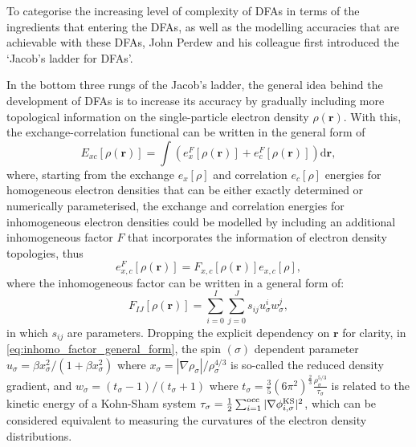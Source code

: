
To categorise the increasing level of complexity of DFAs in terms of the ingredients that entering the DFAs, as well as the modelling accuracies that are achievable with these DFAs, John Perdew and his colleague first introduced the `Jacob's ladder for DFAs'.\cite{perdew2001jacob} 

In the bottom three rungs of the Jacob's ladder, the general idea behind the development of DFAs is to increase its accuracy by gradually including more topological information on the single-particle electron density $\rho(\bm{r})$. With this, the exchange-correlation functional can be written in the general form of 
\begin{equation}\label{eq:Exc_general}
E_{xc}[\rho(\bm{r})]=\int (e_x^{F}[\rho(\bm{r})] + e_c^{F}[\rho(\bm{r})]) \mbox{d}\bm{r},
\end{equation}
where, starting from the exchange $e_{x}[\rho]$ and correlation $e_{c}[\rho]$ energies for homogeneous electron densities that can be either exactly determined or numerically parameterised, the exchange and correlation energies for inhomogeneous electron densities could be modelled by including an additional inhomogeneous factor $F$ that incorporates the information of electron density topologies, thus
\begin{equation}\label{eq:Exc_inhomo}
    e^{F}_{x,c}[\rho(\bm{r})]=F_{x,c}[\rho(\bm{r})] e_{x,c}[\rho],
\end{equation}
where the inhomogeneous factor can be written in a general form of:\cite{mardirossian2017thirty}
\begin{equation}\label{eq:inhomo_factor_general_form}
F_{IJ}[\rho(\bm{r})]=\sum_{i=0}^{I}\sum_{j=0}^{J} s_{ij}u_\sigma^i w_\sigma^j, 
\end{equation}
in which $s_{ij}$ are parameters. Dropping the explicit dependency on $\bm{r}$ for clarity, in \cref{eq:inhomo_factor_general_form}, the spin $(\sigma)$ dependent parameter $u_\sigma=\beta x_\sigma^2/(1+\beta x_\sigma^2)$ where $x_\sigma=|\nabla\rho_\sigma|/\rho_\sigma^{4/3}$ is so-called the reduced density gradient, and $w_\sigma=(t_\sigma-1)/(t_\sigma+1)$ where $t_\sigma=\frac{3}{5}(6\pi^2)^{\frac{2}{3}}\frac{\rho^{5/3}_\sigma}{\tau_\sigma}$ is related to the kinetic energy of a Kohn-Sham system $\tau_\sigma=\frac{1}{2}\sum_{i=1}^{\mbox{\scriptsize{occ}}}|\nabla \phi_{i,\sigma}^{\mbox{\scriptsize{KS}}}|^2$, which can be considered equivalent to measuring the curvatures of the electron density distributions. 

